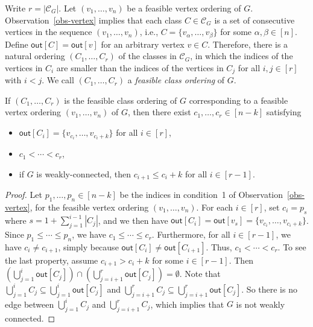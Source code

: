\documentclass[english]{lipics-v2021}
\begin{document}
Write $r = |\mathcal{C}_G|$.
Let $(v_1,\dots,v_n)$ be a feasible vertex ordering of $G$.
Observation~\ref{obs-vertex} implies that each class $C \in \mathcal{C}_G$ is a set of consecutive vertices in the sequence $(v_1,\dots,v_n)$, i.e., $C = \{v_\alpha,\dots,v_\beta\}$ for some $\alpha,\beta \in [n]$.
Define $\mathsf{out}[C] = \mathsf{out}[v]$ for an arbitrary vertex $v \in C$.
Therefore, there is a natural ordering $(C_1,\dots,C_r)$ of the classes in $\mathcal{C}_G$, in which the indices of the vertices in $C_i$ are smaller than the indices of the vertices in $C_j$ for all $i,j \in [r]$ with $i < j$.
We call $(C_1,\dots,C_r)$ a \textit{feasible class ordering} of $G$.

\begin{observation} \label{obs-class}
    If $(C_1,\dots,C_r)$ is the feasible class ordering of $G$ corresponding to a feasible vertex ordering $(v_1,\dots,v_n)$ of $G$, then there exist $c_1,\dots,c_r \in [n-k]$ satisfying
    \begin{itemize}
        \item $\mathsf{out}[C_i] = \{v_{c_i},\dots,v_{c_i+k}\}$ for all $i \in [r]$,
        \item $c_1 < \cdots < c_r$,
        \item if $G$ is weakly-connected, then $c_{i+1} \leq c_i+k$ for all $i \in [r-1]$.
    \end{itemize}
\end{observation}
\begin{proof}
Let $p_1,\dots,p_n \in [n-k]$ be the indices in condition~1 of Observation~\ref{obs-vertex}, for the feasible vertex ordering $(v_1,\dots,v_n)$.
For each $i \in [r]$, set $c_i = p_s$ where $s = 1+ \sum_{j=1}^{i-1} |C_j|$, and we then have $\mathsf{out}[C_i] = \mathsf{out}[v_s] = \{v_{c_i},\dots,v_{c_i+k}\}$.
Since $p_1 \leq \cdots \leq p_n$, we have $c_1 \leq \cdots \leq c_r$.
Furthermore, for all $i \in [r-1]$, we have $c_i \neq c_{i+1}$, simply because $\mathsf{out}[C_i] \neq \mathsf{out}[C_{i+1}]$.
Thus, $c_1 < \cdots < c_r$.
To see the last property, assume $c_{i+1} > c_i+k$ for some $i \in [r-1]$.
Then $(\bigcup_{j=1}^i \mathsf{out}[C_j]) \cap (\bigcup_{j=i+1}^r \mathsf{out}[C_j]) = \emptyset$.
Note that $\bigcup_{j=1}^i C_j \subseteq \bigcup_{j=1}^i \mathsf{out}[C_j]$ and $\bigcup_{j=i+1}^r C_j \subseteq \bigcup_{j=i+1}^r \mathsf{out}[C_j]$.
So there is no edge between $\bigcup_{j=1}^i C_j$ and $\bigcup_{j=i+1}^r C_j$, which implies that $G$ is not weakly connected.
\end{proof}
\end{document}
